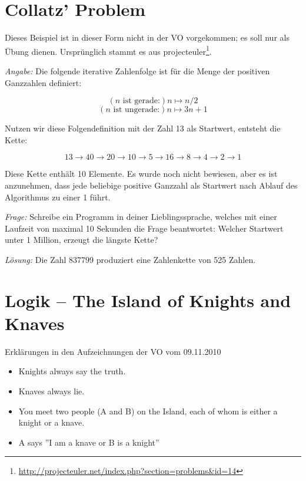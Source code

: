 \documentclass[11pt,a4paper]{article}
\newcommand{\ra}{\rightarrow}
\theoremstyle{area}
\begin{document}
\section{Collatz' Problem}

Dieses Beispiel ist in dieser Form nicht in der VO vorgekommen; es soll
nur als Übung dienen. Ursprünglich stammt es aus
projecteuler\footnote{\url{http://projecteuler.net/index.php?section=problems&id=14}}.

\emph{Angabe:} Die folgende iterative Zahlenfolge ist für die Menge der
    positiven Ganzzahlen definiert:

\begin{equation}
  (n \text{ ist gerade:}) n \mapsto n / 2
\end{equation}
\begin{equation}
  (n \text{ ist ungerade:}) n \mapsto 3n + 1
\end{equation}

Nutzen wir diese Folgendefinition mit der Zahl 13 als Startwert, entsteht
die Kette:

\[
    13 \ra 40 \ra 20 \ra 10 \ra 5 \ra 16 \ra 8 \ra 4 \ra 2 \ra 1
\]

Diese Kette enthält 10 Elemente. Es wurde noch nicht bewiesen, aber es ist
anzunehmen, dass jede beliebige positive Ganzzahl als Startwert nach Ablauf
des Algorithmus zu einer 1 führt.

\emph{Frage:} Schreibe ein Programm in deiner Lieblingssprache, welches mit
    einer Laufzeit von maximal 10 Sekunden die Frage beantwortet: Welcher
    Startwert unter 1 Million, erzeugt die längste Kette?

\emph{Lösung:} Die Zahl 837799 produziert eine Zahlenkette von 525 Zahlen.

\section{Logik -- The Island of Knights and Knaves}

Erklärungen in den Aufzeichnungen der VO vom 09.11.2010

\begin{itemize}
  \item Knights always say the truth.
  \item Knaves always lie.
  \item You meet two people (A and B) on the Island, each of whom is
    either a knight or a knave.
  \item A says ''I am a knave or B is a knight''
\end{itemize}
\end{document}
